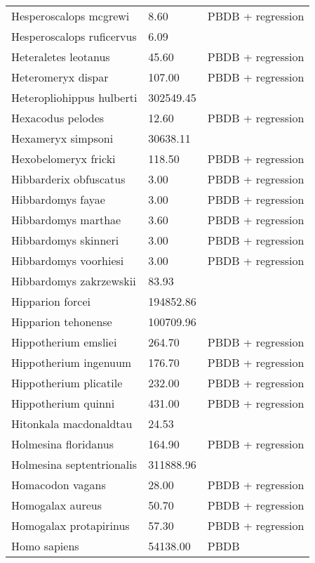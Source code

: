 \begin{longtable}{p{} p{} p{}}
    Hesperoscalops mcgrewi & 8.60 & PBDB + regression \\ 
    Hesperoscalops ruficervus & 6.09 & \cite{Zack2005} \\ 
    Heteraletes leotanus & 45.60 & PBDB + regression \\ 
    Heteromeryx dispar & 107.00 & PBDB + regression \\ 
    Heteropliohippus hulberti & 302549.45 & \cite{Tomiya2013} \\ 
    Hexacodus pelodes & 12.60 & PBDB + regression \\ 
    Hexameryx simpsoni & 30638.11 & \cite{Tomiya2013} \\ 
    Hexobelomeryx fricki & 118.50 & PBDB + regression \\ 
    Hibbarderix obfuscatus & 3.00 & PBDB + regression \\ 
    Hibbardomys fayae & 3.00 & PBDB + regression \\ 
    Hibbardomys marthae & 3.60 & PBDB + regression \\ 
    Hibbardomys skinneri & 3.00 & PBDB + regression \\ 
    Hibbardomys voorhiesi & 3.00 & PBDB + regression \\ 
    Hibbardomys zakrzewskii & 83.93 & \cite{Tomiya2013} \\ 
    Hipparion forcei & 194852.86 & \cite{Tomiya2013} \\ 
    Hipparion tehonense & 100709.96 & \cite{Tomiya2013} \\ 
    Hippotherium emsliei & 264.70 & PBDB + regression \\ 
    Hippotherium ingenuum & 176.70 & PBDB + regression \\ 
    Hippotherium plicatile & 232.00 & PBDB + regression \\ 
    Hippotherium quinni & 431.00 & PBDB + regression \\ 
    Hitonkala macdonaldtau & 24.53 & \cite{Tomiya2013} \\ 
    Holmesina floridanus & 164.90 & PBDB + regression \\ 
    Holmesina septentrionalis & 311888.96 & \cite{Brook2004a} \\ 
    Homacodon vagans & 28.00 & PBDB + regression \\ 
    Homogalax aureus & 50.70 & PBDB + regression \\ 
    Homogalax protapirinus & 57.30 & PBDB + regression \\ 
    Homo sapiens & 54138.00 & PBDB \\ 

\end{longtable}
